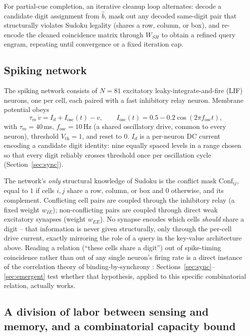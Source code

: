 \documentclass[11pt]{article}
\begin{document}
For partial-cue completion, an iterative cleanup loop alternates: decode a candidate digit
assignment from $\hat b$, mask out any decoded same-digit pair that structurally violates
Sudoku legality (shares a row, column, or box), and re-encode the cleaned coincidence matrix
through $W_{SH}$ to obtain a refined query engram, repeating until convergence or a fixed
iteration cap.

\subsection{Spiking network}

The spiking network consists of $N=81$ excitatory leaky-integrate-and-fire (LIF) neurons,
one per cell, each paired with a fast inhibitory relay neuron. Membrane potential obeys
\begin{equation}
\tau_m \,\dot v = I_d + I_{\mathrm{osc}}(t) - v, \qquad
I_{\mathrm{osc}}(t) = 0.5 - 0.2\cos(2\pi f_{\mathrm{osc}} t),
\end{equation}
with $\tau_m = 40$\,ms, $f_{\mathrm{osc}} = 10$\,Hz (a shared oscillatory drive, common to
every neuron), threshold $V_{\mathrm{th}}=1$, and reset to $0$. $I_d$ is a per-neuron DC
current encoding a candidate digit identity: nine equally spaced levels in a range chosen so
that every digit reliably crosses threshold once per oscillation cycle
(Section~\ref{sec:sync}).

The network's \emph{only} structural knowledge of Sudoku is the conflict mask
$\mathrm{Conf}_{ij}$, equal to $1$ if cells $i,j$ share a row, column, or box and $0$
otherwise, and its complement. Conflicting cell pairs are coupled through the inhibitory
relay (a fixed weight $w_{IE}$);
non-conflicting pairs are coupled through direct weak excitatory synapses (weight $w_{EE}$).
No synapse encodes which cells \emph{should} share a digit -- that information is never
given structurally, only through the per-cell drive current, exactly mirroring the role of a
query in the key-value architecture above. Reading a relation (``these cells share a digit'')
out of spike-timing coincidence rather than out of any single neuron's firing rate is a direct
instance of the correlation theory of binding-by-synchrony
\cite{malsburg1981,singer1995}: Sections~\ref{sec:sync}--\ref{sec:emergent} test whether that
hypothesis, applied to this specific combinatorial relation, actually works.

\subsection{A division of labor between sensing and memory, and a combinatorial capacity bound}
\label{sec:capacity-theory}
\end{document}
